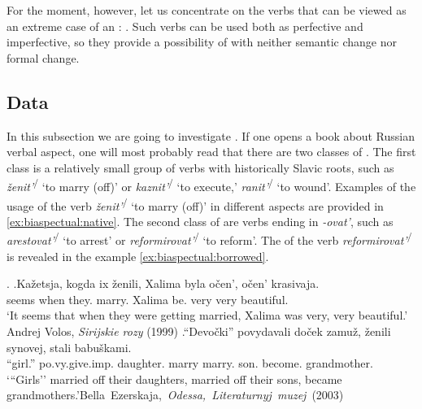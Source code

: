 For the moment, however, let us concentrate on the verbs that can be viewed as an extreme case of an : . Such verbs can be used both as perfective and imperfective, so they provide a possibility of  with neither semantic change nor formal change.

\subsection{Data}\label{subsection:bi:data}


In this subsection we are going to investigate . If one opens a book about Russian verbal aspect, one will most probably read that there are two classes of . The first class is a relatively small group of verbs with historically Slavic roots, such as \textit{\v{z}enit'}\textsuperscript{\PF\slash\IPF} `to marry (off)' or \textit{kaznit'}\textsuperscript{\PF\slash\IPF} `to execute,' \textit{ranit'}\textsuperscript{\PF\slash\IPF} `to wound'. Examples of the usage of the verb \textit{\v{z}enit'}\textsuperscript{\PF\slash\IPF} `to marry (off)' in different aspects are provided in \ref{ex:biaspectual:native}. The second class of  are  verbs ending in \textit{-ovat'}, such as \textit{arestovat'}\textsuperscript{\PF\slash\IPF} `to arrest' or \textit{reformirovat'}\textsuperscript{\PF\slash\IPF} `to reform'. The  of the verb \textit{reformirovat'}\textsuperscript{\PF\slash\IPF} is revealed in the example \ref{ex:biaspectual:borrowed}. 

\ex.\label{ex:biaspectual:native}
\ag.Ka\v{z}etsja, kogda ix \v{z}enili\textsuperscript{\IPF}, Xalima byla o\v{c}en', o\v{c}en' krasivaja.\\
seems when they. marry. Xalima be. very very beautiful.\\
\trans `It seems that when they were getting married, Xalima was very, very beautiful.' \hfill Andrej Volos, \textit{Sirijskie rozy} (1999)
\bg.``Devo\v{c}ki'' povydavali do\v{c}ek zamu\v{z}, \v{z}enili\textsuperscript{\PF} synovej, stali babu\v{s}kami.\\
``girl.'' po.vy.give.imp. daughter. marry marry. son. become. grandmother.\\
\trans `{``}Girls'' married off their daughters, married off their sons, became grandmothers.'\hfill\hbox{Bella Ezerskaja, \textit{Odessa, Literaturnyj muzej} (2003)}

